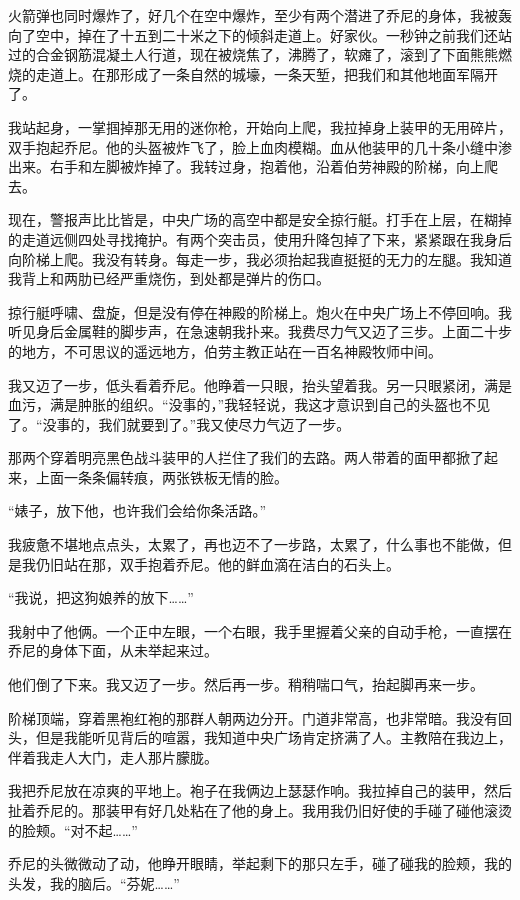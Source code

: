 \documentclass[AutoFakeBold=true]{book}
\begin{document}
火箭弹也同时爆炸了，好几个在空中爆炸，至少有两个潜进了乔尼的身体，我被轰向了空中，掉在了十五到二十米之下的倾斜走道上。好家伙。一秒钟之前我们还站过的合金钢筋混凝土人行道，现在被烧焦了，沸腾了，软瘫了，滚到了下面熊熊燃烧的走道上。在那形成了一条自然的城壕，一条天堑，把我们和其他地面军隔开了。

我站起身，一掌掴掉那无用的迷你枪，开始向上爬，我拉掉身上装甲的无用碎片，双手抱起乔尼。他的头盔被炸飞了，脸上血肉模糊。血从他装甲的几十条小缝中渗出来。右手和左脚被炸掉了。我转过身，抱着他，沿着伯劳神殿的阶梯，向上爬去。

现在，警报声比比皆是，中央广场的高空中都是安全掠行艇。打手在上层，在糊掉的走道远侧四处寻找掩护。有两个突击员，使用升降包掉了下来，紧紧跟在我身后向阶梯上爬。我没有转身。每走一步，我必须抬起我直挺挺的无力的左腿。我知道我背上和两肋已经严重烧伤，到处都是弹片的伤口。

掠行艇呼啸、盘旋，但是没有停在神殿的阶梯上。炮火在中央广场上不停回响。我听见身后金属鞋的脚步声，在急速朝我扑来。我费尽力气又迈了三步。上面二十步的地方，不可思议的遥远地方，伯劳主教正站在一百名神殿牧师中间。

我又迈了一步，低头看着乔尼。他睁着一只眼，抬头望着我。另一只眼紧闭，满是血污，满是肿胀的组织。``没事的，''我轻轻说，我这才意识到自己的头盔也不见了。``没事的，我们就要到了。''我又使尽力气迈了一步。

那两个穿着明亮黑色战斗装甲的人拦住了我们的去路。两人带着的面甲都掀了起来，上面一条条偏转痕，两张铁板无情的脸。

``婊子，放下他，也许我们会给你条活路。''

我疲惫不堪地点点头，太累了，再也迈不了一步路，太累了，什么事也不能做，但是我仍旧站在那，双手抱着乔尼。他的鲜血滴在洁白的石头上。

``我说，把这狗娘养的放下……''

我射中了他俩。一个正中左眼，一个右眼，我手里握着父亲的自动手枪，一直摆在乔尼的身体下面，从未举起来过。

他们倒了下来。我又迈了一步。然后再一步。稍稍喘口气，抬起脚再来一步。

阶梯顶端，穿着黑袍红袍的那群人朝两边分开。门道非常高，也非常暗。我没有回头，但是我能听见背后的喧嚣，我知道中央广场肯定挤满了人。主教陪在我边上，伴着我走人大门，走人那片朦胧。

我把乔尼放在凉爽的平地上。袍子在我俩边上瑟瑟作响。我拉掉自己的装甲，然后扯着乔尼的。那装甲有好几处粘在了他的身上。我用我仍旧好使的手碰了碰他滚烫的脸颊。``对不起……''

乔尼的头微微动了动，他睁开眼睛，举起剩下的那只左手，碰了碰我的脸颊，我的头发，我的脑后。``芬妮……''
\end{document}
